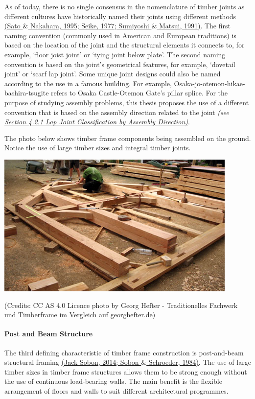 \documentclass[11pt]{book}
\begin{document}
As of today, there is no single consensus in the nomenclature of timber joints as different cultures have historically named their joints using different methods \href{https://www.zotero.org/google-docs/?WvT4uQ}{(Sato $\&$ Nakahara, 1995; Seike, 1977; Sumiyoshi $\&$ Matsui, 1991)}. The first naming convention (commonly used in American and European traditions) is based on the location of the joint and the structural elements it connects to, for example, ‘floor joist joint’ or ‘tying joint below plate’. The second naming convention is based on the joint's geometrical features, for example, ‘dovetail joint’ or ‘scarf lap joint’. Some unique joint designs could also be named according to the use in a famous building. For example, Osaka-jo-otemon-hikae-bashira-tsugite refers to Osaka Castle-Otemon Gate's pillar splice. For the purpose of studying assembly problems, this thesis proposes the use of a different convention that is based on the assembly direction related to the joint \textit{(see \uline{Section 4.2.1 Lap Joint Classification by Assembly Direction)}}.

The photo below shows timber frame components being assembled on the ground. Notice the use of large timber sizes and integral timber joints. 

\includegraphics[width=11.91cm,height=7.12cm]{./images/image5.jpg} \\ {\footnotesize (Credits: CC AS 4.0 Licence photo by Georg Hefter - Traditionelles Fachwerk und Timberframe im Vergleich auf georghefter.de)\par}

\paragraph{Post and Beam Structure}

The third defining characteristic of timber frame construction is post-and-beam structural framing \href{https://www.zotero.org/google-docs/?KMFAqo}{(Jack Sobon, 2014; Sobon $\&$ Schroeder, 1984)}. The use of large timber sizes in timber frame structures allows them to be strong enough without the use of continuous load-bearing walls. The main benefit is the flexible arrangement of floors and walls to suit different architectural programmes. 
\end{document}
